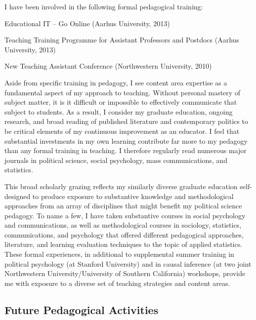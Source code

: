 \documentclass[12pt]{article}
\begin{document}
I have been involved in the following formal pedagogical training:

\begin{itemize*}
\item Educational IT -- Go Online (Aarhus University, 2013)
\item Teaching Training Programme for Assistant Professors and Postdocs (Aarhus University, 2013)
\item New Teaching Assistant Conference (Northwestern University, 2010)
\end{itemize*}

Aside from specific training in pedagogy, I see content area expertise as a fundamental aspect of my approach to teaching. Without personal mastery of subject matter, it is it difficult or impossible to effectively communicate that subject to students. As a result, I consider my graduate education, ongoing research, and broad reading of published literature and contemporary politics to be critical elements of my continuous improvement as an educator. I feel that substantial investments in my own learning contribute far more to my pedagogy than any formal training in teaching. I therefore regularly read numerous major journals in political science, social psychology, mass communications, and statistics.

This broad scholarly grazing reflects my similarly diverse graduate education self-designed to produce exposure to substantive knowledge and methodological approaches from an array of disciplines that might benefit my political science pedagogy. To name a few, I have taken substantive courses in social psychology and communications, as well as methodological courses in sociology, statistics, communications, and psychology that offered different pedagogical approaches, literature, and learning evaluation techniques to the topic of applied statistics. These formal experiences, in additional to supplemental summer training in political psychology (at Stanford University) and in causal inference (at two joint Northwestern University/University of Southern California) workshops, provide me with exposure to a diverse set of teaching strategies and content areas.

\subsection{Future Pedagogical Activities}
\end{document}
